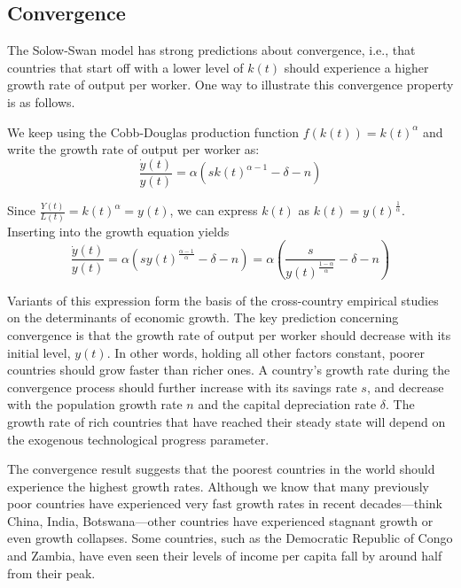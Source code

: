 \documentclass[\topdir/lecture\_notes.tex]{subfiles}
\begin{document}
\subsection{Convergence}
The Solow-Swan model has strong predictions about convergence, i.e., that countries that start off with a lower level of $k(t)$ should experience a higher growth rate of output per worker.
One way to illustrate this convergence property is as follows.

We keep using the Cobb-Douglas production function $f(k(t))=k(t)^{\alpha}$ and write the growth rate of output per worker as:
\begin{equation}
  \frac{\dot{y}(t)}{y(t)}=\alpha\left(s k(t)^{\alpha-1}-\delta-n\right)
  \label{eq:solow-convergence-growth}
\end{equation}

Since $\frac{Y(t)}{L(t)}=k(t)^{\alpha}=y(t)$, we can express $k(t)$ as $k(t)=y(t)^{\frac{1}{\alpha}}$.
Inserting into the growth equation yields
\begin{equation}
  \frac{\dot{y}(t)}{y(t)}=\alpha\left(s y(t)^{\frac{\alpha-1}{\alpha}}-\delta-n\right)=\alpha\left(\frac{s}{y(t)^{\frac{1-\alpha}{\alpha}}}-\delta-n\right)
  \label{eq:solow-convergence-y}
\end{equation}

Variants of this expression form the basis of the cross-country empirical studies on the determinants of economic growth.
The key prediction concerning convergence is that the growth rate of output per worker should decrease with its initial level, $y(t)$.
In other words, holding all other factors constant, poorer countries should grow faster than richer ones.
A country's growth rate during the convergence process should further increase with its savings rate $s$, and decrease with the population growth rate $n$ and the capital depreciation rate $\delta$.
The growth rate of rich countries that have reached their steady state will depend on the exogenous technological progress parameter.

The convergence result suggests that the poorest countries in the world should experience the highest growth rates.
Although we know that many previously poor countries have experienced very fast growth rates in recent decades---think China, India, Botswana---other countries have experienced stagnant growth or even growth collapses.
Some countries, such as the Democratic Republic of Congo and Zambia, have even seen their levels of income per capita fall by around half from their peak.
\end{document}
